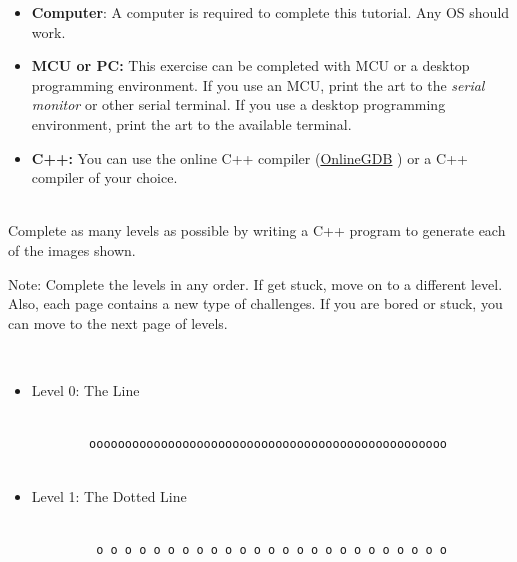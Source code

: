 \documentclass[12pt]{article}
\begin{document}
\begin{description}[labelindent=1cm]
	
	\item[\textbf{\underline{System Requirements:}}] \hfill \vspace{0mm}

\begin{itemize}
	\item {\bf Computer}: A computer is required to complete this tutorial. Any OS should work.
	\item {\bf MCU or PC:} This exercise can be completed with MCU or a desktop programming environment. If you use an MCU, print the art to the {\it serial monitor} or other serial terminal. If you use a desktop programming environment, print the art to the available terminal.
	
	\item {\bf C++:} You can use the online C++ compiler (\href{https://www.onlinegdb.com/online\_c++\_compiler}{OnlineGDB} ) or a C++ compiler of your choice.
\end{itemize}

	\item[\textbf{\underline{Problem Statement:}}] \hfill \vspace{0mm} \\
	Complete as many levels as possible by writing a C++ program to generate each of the images shown. 
	
	Note: Complete the levels in any order. If get stuck, move on to a different level. Also, each page contains a new type of challenges. If you are bored or stuck, you can move to the next page of levels.  
	
\newpage	
	
	\item[\textbf{\underline{The Levels:}}] \hfill \vspace{0mm} \\
	\begin{itemize}

		\item Level 0: The Line
		
		\begin{lstlisting}
		
		oooooooooooooooooooooooooooooooooooooooooooooooooo
		
		\end{lstlisting}
		
		\item Level 1: The Dotted Line
		
		\begin{lstlisting}
		
		 o o o o o o o o o o o o o o o o o o o o o o o o o
		

\end{lstlisting}
\end{itemize}
\end{description}
\end{document}
